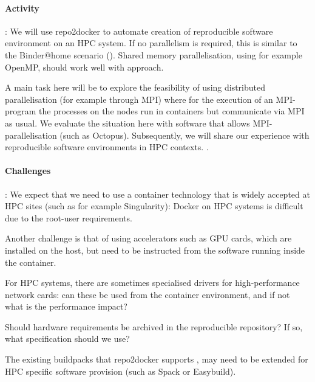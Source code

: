 \begin{task}
\paragraph*{Activity}: We will use repo2docker to automate creation of
reproducible software environment on an HPC system. If no parallelism is
required, this is similar to the Binder@home scenario
(). Shared memory parallelisation, using for
example OpenMP, should work well with approach.

A main task here will be to explore the feasibility of using distributed
parallelisation (for example through MPI) where for the execution of an
MPI-program the processes on the nodes run in containers but communicate via MPI
as usual. We evaluate the situation here with software that allows
MPI-parallelisation (such as Octopus). Subsequently, we will share our experience with
reproducible software environments in HPC contexts. .

\paragraph*{Challenges}: We expect that we need to use a container technology
that is widely accepted at HPC sites (such as for example Singularity): Docker
on HPC systems is difficult due to the root-user requirements.

Another challenge is that of using accelerators such as GPU cards, which are
installed on the host, but need to be instructed from the software running
inside the container. 

For HPC systems, there are sometimes specialised drivers for high-performance
network cards: can these be used from the container environment, and if not what
is the performance impact?

Should hardware requirements be archived in the reproducible repository? If so,
what specification should we use?

The existing buildpacks that repo2docker supports , may need to be extended for HPC specific software
provision (such as Spack or Easybuild).


\end{task}
